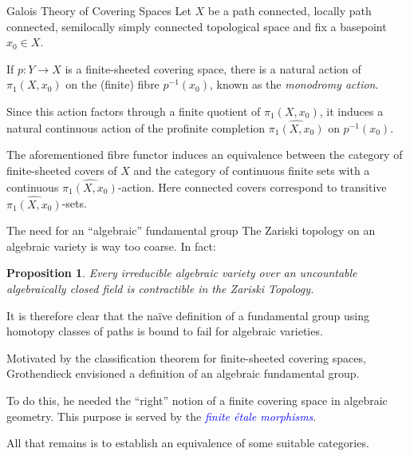 \documentclass{beamer}
\newtheorem{proposition}[theorem]{Proposition}
\newcommand{\wh}[1]{\widehat{#1}}
\newcommand{\define}[1]{\textcolor{blue}{\textit{#1}}}
\begin{document}
\begin{frame}{Galois Theory of Covering Spaces}
	Let $X$ be a path connected, locally path connected, semilocally simply connected topological space and fix a basepoint $x_0\in X$.  \pause 

	If $p: Y\to X$ is a finite-sheeted covering space, there is a natural action of $\pi_1(X, x_0)$ on the (finite) fibre $p^{-1}(x_0)$, known as the \emph{monodromy action}.  \pause 

	Since this action factors through a finite quotient of $\pi_1(X, x_0)$, it induces a natural continuous action of the profinite completion $\wh{\pi_1(X, x_0)}$ on $p^{-1}(x_0)$.  \pause 

	\begin{theorem}
		The aforementioned fibre functor induces an equivalence between the category of finite-sheeted covers of $X$ and the category of continuous finite sets with a continuous $\wh{\pi_1(X, x_0)}$-action. Here connected covers correspond to transitive $\wh{\pi_1(X, x_0)}$-sets.
	\end{theorem}
\end{frame}

\begin{frame}{The need for an ``algebraic'' fundamental group}
	The Zariski topology on an algebraic variety is way too coarse. In fact: 
	\begin{proposition}
		Every irreducible algebraic variety over an uncountable algebraically closed field is contractible in the Zariski Topology.
	\end{proposition}\pause 

	It is therefore clear that the na\"ive definition of a fundamental group using homotopy classes of paths is bound to fail for algebraic varieties. \pause 

	Motivated by the classification theorem for finite-sheeted covering spaces, Grothendieck envisioned a definition of an algebraic fundamental group. \pause 

	To do this, he needed the ``right'' notion of a finite covering space in algebraic geometry. This purpose is served by the \define{finite \'etale morphisms}.  \pause 
	
	All that remains is to establish an equivalence of some suitable categories.
\end{frame}
\end{document}
